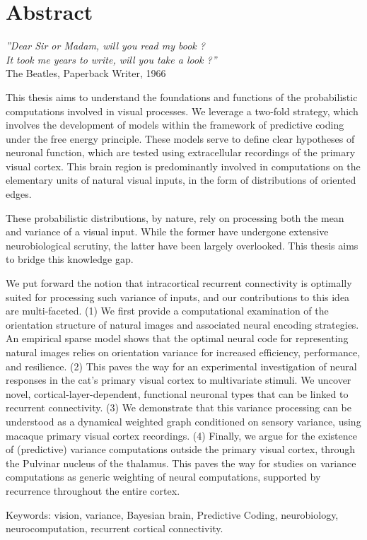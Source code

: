 \chapter*{Abstract}
\begin{flushright}
    \textit{''Dear Sir or Madam, will you read my book ?\\
    It took me years to write, will you take a look ?''}\\
    The Beatles, Paperback Writer, 1966
\end{flushright}

This thesis aims to understand the foundations and functions of the probabilistic computations involved in visual processes.  We leverage a two-fold strategy, which involves the development of models within the framework of predictive coding under the free energy principle. 
These models serve to define clear hypotheses of neuronal function, which are tested using extracellular recordings of the primary visual cortex. This brain region is predominantly involved in computations on the elementary units of natural visual inputs, in the form of distributions of oriented edges.

These probabilistic distributions, by nature, rely on processing both the mean and variance of a visual input.
While the former have undergone extensive neurobiological scrutiny, the latter have been largely overlooked. This thesis aims to bridge this knowledge gap.

We put forward the notion that intracortical recurrent connectivity is optimally suited for processing such variance of inputs, and our contributions to this idea are multi-faceted. 
(1) We first provide a computational examination of the orientation structure of natural images and associated neural encoding strategies. An empirical sparse model shows that the optimal neural code for representing natural images relies on orientation variance for increased efficiency, performance, and resilience.  
(2) This paves the way for an experimental investigation of neural responses in the cat's primary visual cortex to multivariate stimuli. We uncover novel, cortical-layer-dependent, functional neuronal types that can be linked to recurrent connectivity. 
(3) We demonstrate that this variance processing can be understood as a dynamical weighted graph conditioned on sensory variance, using macaque primary visual cortex recordings.
(4) Finally, we argue for the existence of (predictive) variance computations outside the primary visual cortex, through the Pulvinar nucleus of the thalamus. This paves the way for studies on variance computations as generic weighting of neural computations, supported by recurrence throughout the entire cortex.

\vspace{0.25cm}
Keywords: vision, variance, Bayesian brain, Predictive Coding, neurobiology, neurocomputation, recurrent cortical connectivity.

